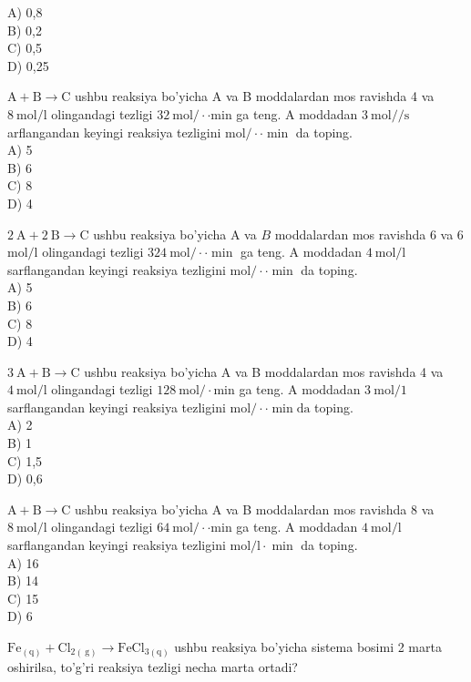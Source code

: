 A) 0,8\\
B) 0,2\\
C) 0,5\\
D) 0,25
  \item $\mathrm{A}+\mathrm{B} \rightarrow \mathrm{C}$ ushbu reaksiya bo'yicha A va B moddalardan mos ravishda 4 va $8 \mathrm{~mol} / \mathrm{l}$ olingandagi tezligi $32 \mathrm{~mol} / \cdot \cdot \mathrm{min}$ ga teng. A moddadan $3 \mathrm{~mol} / / \mathrm{s}$ arflangandan keyingi reaksiya tezligini $\mathrm{mol} / \cdot \cdot \min$ da toping.\\
A) 5\\
B) 6\\
C) 8\\
D) 4
  \item $2 \mathrm{~A}+2 \mathrm{~B} \rightarrow \mathrm{C}$ ushbu reaksiya bo'yicha A va $B$ moddalardan mos ravishda 6 va 6 $\mathrm{mol} / \mathrm{l}$ olingandagi tezligi $324 \mathrm{~mol} / \cdot \cdot \min$ ga teng. A moddadan $4 \mathrm{~mol} / \mathrm{l}$ sarflangandan keyingi reaksiya tezligini $\mathrm{mol} / \cdot \cdot \min$ da toping.\\
A) 5\\
B) 6\\
C) 8\\
D) 4
  \item $3 \mathrm{~A}+\mathrm{B} \rightarrow \mathrm{C}$ ushbu reaksiya bo'yicha A va B moddalardan mos ravishda 4 va $4 \mathrm{~mol} / \mathrm{l}$ olingandagi tezligi $128 \mathrm{~mol} / \cdot \mathrm{min}$ ga teng. A moddadan $3 \mathrm{~mol} / 1$ sarflangandan keyingi reaksiya tezligini $\mathrm{mol} / \cdot \cdot \min \mathrm{da}$ toping.\\
A) 2\\
B) 1\\
C) 1,5\\
D) 0,6
  \item $\mathrm{A}+\mathrm{B} \rightarrow \mathrm{C}$ ushbu reaksiya bo'yicha A va B moddalardan mos ravishda 8 va $8 \mathrm{~mol} / \mathrm{l}$ olingandagi tezligi $64 \mathrm{~mol} / \cdot \cdot \mathrm{min}$ ga teng. A moddadan $4 \mathrm{~mol} / \mathrm{l}$ sarflangandan keyingi reaksiya tezligini $\mathrm{mol} / \mathrm{l} \cdot \min$ da toping.\\
A) 16\\
B) 14\\
C) 15\\
D) 6
  \item $\mathrm{Fe}_{(\mathrm{q})}+\mathrm{Cl}_{2(\mathrm{~g})} \rightarrow \mathrm{FeCl}_{3(\mathrm{q})}$ ushbu reaksiya bo'yicha sistema bosimi 2 marta oshirilsa, to'g'ri reaksiya tezligi necha marta ortadi?\\
